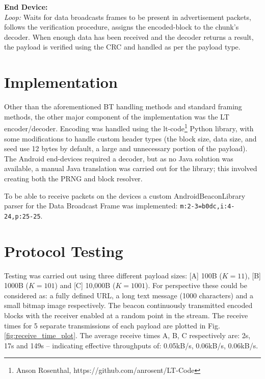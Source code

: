 \documentclass[conference]{IEEEtran} %
\begin{document}
\noindent \textbf{End Device:}\\
\textit{Loop:} Waits for data broadcasts frames to be present in advertisement packets, follows the verification procedure, assigns the encoded-block to the chunk's decoder. When enough data has been received and the decoder returns a result, the payload is verified using the CRC and handled as per the payload type.


\section{Implementation}
Other than the aforementioned BT handling methods and standard framing methods, the other major component of the implementation was the LT encoder/decoder. Encoding was handled using the lt-code\footnote{Anson Rosenthal, https://github.com/anrosent/LT-Code} Python library, with some modifications to handle custom header types (the block size, data size, and seed use 12 bytes by default, a large and unnecessary portion of the payload). The Android end-devices required a decoder, but as no Java solution was available, a manual Java translation was carried out for the library; this involved creating both the PRNG and block resolver. 

To be able to receive packets on the devices a custom AndroidBeaconLibrary parser for the Data Broadcast Frame was implemented: \lstinline[style=standard]{m:2-3=b0dc,i:4-24,p:25-25}. 

\section{Protocol Testing}
Testing was carried out using three different payload sizes: [A] 100B ($K=11$), [B] 1000B ($K=101$) and [C] 10,000B ($K=1001$). For perspective these could be considered as: a fully defined URL, a long text message (1000 characters) and a small bitmap image respectively. The beacon continuously transmitted encoded blocks with the receiver enabled at a random point in the stream. The receive times for 5 separate transmissions of each payload are plotted in Fig. \ref{fig:receive_time_plot}. The average receive times A, B, C respectively are: 2s, 17s and 149s -- indicating effective throughputs of: 0.05kB/s, 0.06kB/s, 0.06kB/s.
 
\end{document}
